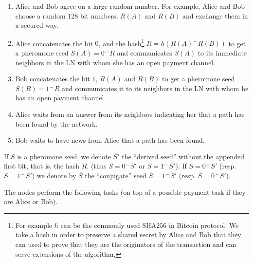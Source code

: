 \documentclass[12pt]{amsart}
\theoremstyle{remark}
\begin{document}
\begin{enumerate}
 \item Alice and Bob agree on a large random number. For example, Alice and Bob choose a 
 random $128$ bit numbers, $R(A)$ and $R(B)$ and exchange them in a secured way.
 \item Alice concatenates the bit $0$, and the hash\footnote{For example $h$ can be the commonly 
 used $\text{SHA256}$ in Bitcoin protocol. We take a hash in order to preserve a shared secret by Alice and Bob
 that they can used to prove that they are the originators of the transaction and can 
 serve extensions of the algorithm.} $R=h(R(A)^\frown R(B))$ to get a pheromone seed $S(A)=0^\frown R$ 
 and communicates $S(A)$ to its immediate neighbors in the LN with whom
 she has an open payment channel.
 \item Bob concatenates the bit $1$, $R(A)$ and $R(B)$ to get a pheromone seed 
 $S(B)=1^\frown R$ and communicates it to its neighbors in the LN with whom
 he has an open payment channel.
 \item Alice waits from an answer from its neighbors indicating her that a path has been found by the network.
 \item Bob waits to have news from Alice that a path has been found.
\end{enumerate}

If $S$ is a pheromone seed, we denote $S'$ the ``derived seed'' without the appended first bit, that is, 
the hash $R$. 
(thus $S= 0^\frown S'$ or  $S= 1^\frown S'$). If 
$S=0^\frown S'$ (resp. $S=1^\frown S'$) we denote by $\bar S$ 
the ``conjugate'' seed $\bar S =  1^\frown S'$ (resp. $\bar S =  0^\frown S'$).

\medskip

The nodes perform the following tasks (on top of a possible payment task if they are Alice or Bob).
\end{document}
